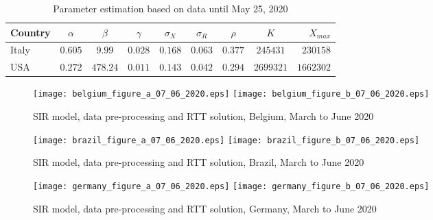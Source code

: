 \documentclass{article}
\begin{document}
\bigskip

\begin{table}
\begin{center}
\begin{tabular}{l|ccccccc|r}
Country & $\alpha$ & $\beta$ & $\gamma$ & $\sigma_X $ & $ \sigma_R$ & $\rho$ & $K$ & $X_{max}$ \\ \hline
Italy  & $0.605$ & $9.99$ & $0.028$ & $0.168$ & $0.063$ & $0.377$ & $245431$ & $230158$ \\
USA    & $0.272$  & $478.24$ & $0.011$ & $0.143$ & $0.042$ & $0.294$ & $2699321$ & $1662302$\\ \hline
\end{tabular}
\caption{
Parameter estimation based on data until May 25, 2020
\label{tablemay25}
}
\end{center}
\end{table}


\begin{figure}
\begin{center}
{\texttt{[image: belgium\_figure\_a\_07\_06\_2020.eps]}}
\qquad
{\texttt{[image: belgium\_figure\_b\_07\_06\_2020.eps]}}
\end{center}
\begin{center}
\caption{SIR model, data pre-processing and RTT solution, Belgium, March to June 2020
}
\label{fig:belgium_sir_model_07_06_2020}
\end{center}
\end{figure}

\begin{figure}
\begin{center}
{\texttt{[image: brazil\_figure\_a\_07\_06\_2020.eps]}}
\qquad
{\texttt{[image: brazil\_figure\_b\_07\_06\_2020.eps]}}
\end{center}
\begin{center}
\caption{SIR model, data pre-processing and RTT solution, Brazil, March to June 2020
}
\label{fig:brazil_sir_model_07_06_2020}
\end{center}
\end{figure}

\begin{figure}
\begin{center}
{\texttt{[image: germany\_figure\_a\_07\_06\_2020.eps]}}
\qquad
{\texttt{[image: germany\_figure\_b\_07\_06\_2020.eps]}}
\end{center}
\begin{center}
\caption{SIR model, data pre-processing and RTT solution, Germany, March to June 2020
}
\label{fig:germany_sir_model_07_06_2020}
\end{center}
\end{figure}
\end{document}
